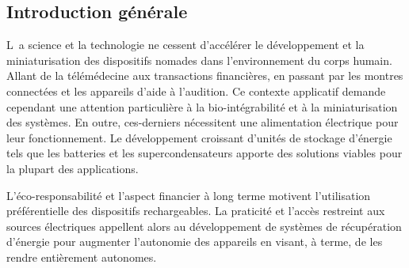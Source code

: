 
{}

\vspace*{-1cm}
\begin{flushright}
\section*{\fontsize{24pt}{24pt}\selectfont\textnormal{Introduction générale}}
\end{flushright}
\vspace{2cm}

\chead[\fancyplain{}{}]
      {\fancyplain{}{}}
\lfoot[\fancyplain{}{}]%
      {\fancyplain{}{}}
\cfoot[\fancyplain{}{\thepage}]
      {\fancyplain{}{\thepage}}
\rfoot[\fancyplain{}{}]%
     {\fancyplain{}{\scriptsize}}
     
     


\lettrine[lines=1]{L~}{}a science et la technologie ne cessent d'accélérer le développement et la miniaturisation des dispositifs nomades dans l'environnement du corps humain. Allant de la télémédecine aux transactions financières, en passant par les montres connectées et les appareils d'aide à l'audition. Ce contexte applicatif demande cependant une attention particulière à la bio-intégrabilité et à la miniaturisation des systèmes. En outre, ces-derniers nécessitent une alimentation électrique pour leur fonctionnement. Le développement croissant d'unités de stockage d'énergie tels que les batteries et les supercondensateurs apporte des solutions viables pour la plupart des applications.

L'éco-responsabilité et l'aspect financier à long terme motivent l'utilisation préférentielle des dispositifs rechargeables. La praticité et l'accès restreint aux sources électriques appellent alors au développement de systèmes de récupération d'énergie pour augmenter l'autonomie des appareils en visant, à terme, de les rendre entièrement autonomes.


